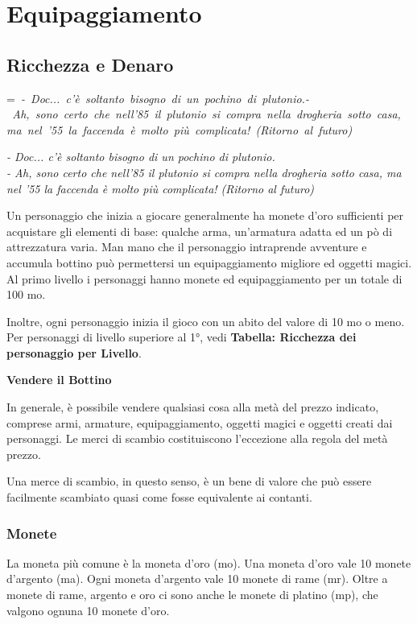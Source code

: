 \documentclass[a4paper,11pt,twoside,openany]{book}
\makeatletter
\newcommand{\mybox}[1]{%
	\setbox0=\hbox{#1}%
	\setlength{\@tempdima}{\dimexpr\wd0+13pt}%
	\begin{tcolorbox}[boxrule=0.5pt,arc=4pt, breakable,enhanced,
		left=6pt,right=6pt,top=6pt,bottom=6pt,boxsep=0pt,width=\@tempdima]
		#1
	\end{tcolorbox}
}
\makeatother
\begin{document}
{\begin{tabular}{llllll}
\end{tabular}

\pagebreak

\section{Equipaggiamento}

\label{equipaggiamento}

\subsection{Ricchezza e Denaro}


\mybox{\textit{
- Doc... c'è soltanto bisogno di un pochino di plutonio.\\
- Ah, sono certo che nell'85 il plutonio si compra nella drogheria sotto casa, ma nel '55 la faccenda è molto più complicata! (Ritorno al futuro)
}}\medskip


\label{ricchezza-e-denaro}

Un personaggio che inizia a giocare generalmente ha monete d'oro sufficienti per acquistare gli elementi di base: qualche arma, un'armatura adatta ed un pò di attrezzatura varia. Man mano che il personaggio intraprende avventure e accumula bottino può permettersi un equipaggiamento migliore ed oggetti magici. Al primo livello i personaggi hanno monete ed equipaggiamento per un totale di 100 mo.

Inoltre, ogni personaggio inizia il gioco con un abito del valore di 10 mo o meno. Per personaggi di livello superiore al 1°, vedi \textbf{Tabella: Ricchezza dei personaggio per Livello}.

\textbf{Vendere il Bottino}

In generale, è possibile vendere qualsiasi cosa alla metà del prezzo indicato, comprese armi, armature, equipaggiamento, oggetti magici e oggetti creati dai personaggi. Le merci di scambio costituiscono l'eccezione alla regola del metà prezzo.

Una merce di scambio, in questo senso, è un bene di valore che può essere facilmente scambiato quasi come fosse equivalente ai contanti.

\bigskip

\subsubsection{Monete}

La moneta più comune è la moneta d'oro (mo). Una moneta d'oro vale 10 monete d'argento (ma). Ogni moneta d'argento vale 10 monete di rame (mr). Oltre a monete di rame, argento e oro ci sono anche le monete di platino (mp), che valgono ognuna 10 monete d'oro.

}
\end{document}
